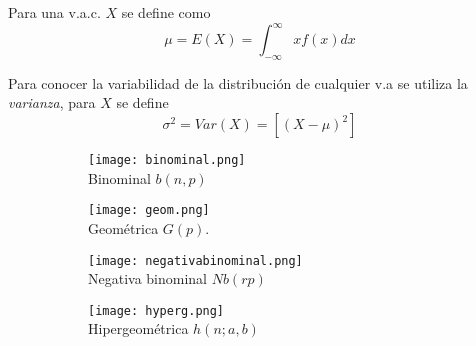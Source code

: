 Para una v.a.c. $X$ se define como
\begin{equation}
\mu=E(X)=\int_{-\infty}^{\infty}xf(x)dx
\end{equation}

Para conocer la variabilidad de la distribución de cualquier v.a se utiliza la \emph{varianza}, para $X$ se define
\begin{equation}
\sigma^2=Var(X)=[{(X-\mu)}^2]
\end{equation}

\begin{figure}[H]\caption[Distribuciones]{Diversas de distribuciones pueden para modelar v.a.s, a continuación se muestran las mas importantes de acuerdo a \citeauthor{bala20} (\citeyear{bala20}).}\label{FIG:DISTS}
\begin{subfigure}[t]{.475\textwidth}\texttt{[image: binominal.png]}\centering\\Binominal $b(n,p)$
\end{subfigure}\qquad
\begin{subfigure}[t]{.475\textwidth}\texttt{[image: geom.png]}\centering\\Geométrica $G(p)$.
\end{subfigure}
\end{figure}

\begin{figure}[H]
\begin{subfigure}[t]{.475\textwidth}\texttt{[image: negativabinominal.png]}\centering\\Negativa binominal $Nb(rp)$
\end{subfigure}\qquad
\begin{subfigure}[t]{.475\textwidth}\texttt{[image: hyperg.png]}\centering\\Hipergeométrica $h(n;a,b)$
\end{subfigure}
\end{figure}

